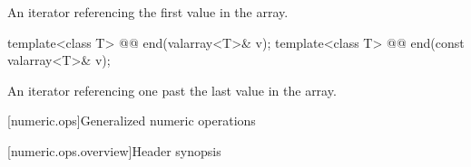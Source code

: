 \begin{itemdescr}
\pnum
\returns An iterator referencing the first value in the array.
\end{itemdescr}

%
\begin{itemdecl}
template<class T> @@ end(valarray<T>& v);
template<class T> @@ end(const valarray<T>& v);
\end{itemdecl}

\begin{itemdescr}
\pnum
\returns An iterator referencing one past the last value in the array.
\end{itemdescr}


[numeric.ops]{Generalized numeric operations}

[numeric.ops.overview]{Header  synopsis}

